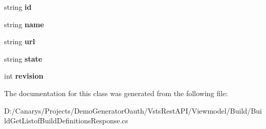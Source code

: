 \begin{DoxyCompactItemize}
\item 
\mbox{\label{class_vsts_rest_a_p_i_1_1_viewmodel_1_1_build_1_1_build_get_listof_build_definitions_response_1_1_project_a6677a252672515c3d7fb9b860757df64}} 
string {\bfseries id}
\item 
\mbox{\label{class_vsts_rest_a_p_i_1_1_viewmodel_1_1_build_1_1_build_get_listof_build_definitions_response_1_1_project_a91282ace08f724a9534ff84e9fb0ecfa}} 
string {\bfseries name}
\item 
\mbox{\label{class_vsts_rest_a_p_i_1_1_viewmodel_1_1_build_1_1_build_get_listof_build_definitions_response_1_1_project_a5c8a53f8b0e60d4954d81feb3fe6f1ac}} 
string {\bfseries url}
\item 
\mbox{\label{class_vsts_rest_a_p_i_1_1_viewmodel_1_1_build_1_1_build_get_listof_build_definitions_response_1_1_project_a49cff0b1c4490f2a7e16095ca8a2f30c}} 
string {\bfseries state}
\item 
\mbox{\label{class_vsts_rest_a_p_i_1_1_viewmodel_1_1_build_1_1_build_get_listof_build_definitions_response_1_1_project_a44fe87571c65dd4461e017bd642ef90d}} 
int {\bfseries revision}
\end{DoxyCompactItemize}


The documentation for this class was generated from the following file\+:\begin{DoxyCompactItemize}
\item 
D\+:/\+Canarys/\+Projects/\+Demo\+Generator\+Oauth/\+Vsts\+Rest\+A\+P\+I/\+Viewmodel/\+Build/Build\+Get\+Listof\+Build\+Definitions\+Response.\+cs\end{DoxyCompactItemize}
